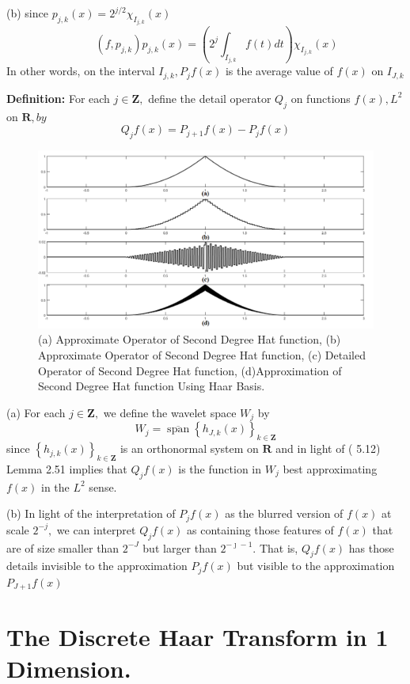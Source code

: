 (b) since $p_{j, k}(x)=2^{j / 2} \chi_{I_{j, k}}(x)$
$$
\qquad\left(f, p_{j, k}\right) p_{j, k}(x)=\left(2^{j} \int_{I_{j, k}} f(t) d t\right) \chi_{I_{j, k}}(x) 
$$
In other words, on the interval $ I_{j, k}, P_{j} f(x)$ is the average value of $f(x)$ on ${I_{J, k}}$


\textbf{Definition:} For each $j \in \mathbf{Z},$ define the detail operator $Q_{j}$ on functions
$f(x), L^{2}$ on $\mathbf{R}, b y$
$$
Q_{j} f(x)=P_{j+1} f(x)-P_{j} f(x)
$$

\begin{figure}[h]
    \centering
    \includegraphics[width=\textwidth]{PxQxFx.png}
    \caption{(a) Approximate Operator of Second Degree Hat function, (b) Approximate Operator of Second Degree Hat function, (c) Detailed Operator of Second Degree Hat function, (d)Approximation of Second Degree Hat function Using Haar Basis.}
    \label{fig:PxQxFx}
\end{figure}


(a) For each $j \in \mathbf{Z},$ we define the wavelet space $W_{j}$ by
$$
W_{j}=\overline{\operatorname{span}}\left\{h_{J, k}(x)\right\}_{k \in \mathbf{Z}}
$$
since $\left\{h_{j, k}(x)\right\}_{k \in \mathbf{Z}}$ is an orthonormal system on $\mathbf{R}$ and in light of ( 5.12)
Lemma 2.51 implies that $Q_{j} f(x)$ is the function in $W_{j}$ best approximating
$f(x)$ in the $L^{2}$ sense.

(b) In light of the interpretation of $P_{j} f(x)$ as the blurred version of $f(x)$
at scale $2^{-j},$ we can interpret $Q_{j} f(x)$ as containing those features of $f(x)$
that are of size smaller than $2^{-J}$ but larger than $2^{-\jmath-1} .$ That is, $Q_{j} f(x)$
has those details invisible to the approximation $P_{j} f(x)$ but visible to the
approximation $P_{J+1} f(x)$

\section{The Discrete Haar Transform in 1 Dimension.}

